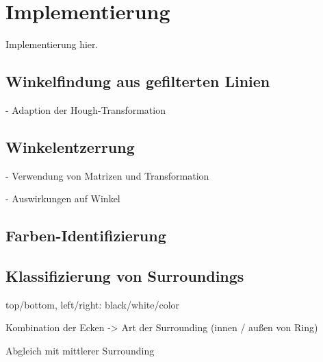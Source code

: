 
\section{Implementierung}
\label{sec:cv:implementierung}

Implementierung hier.


\subsection{Winkelfindung aus gefilterten Linien}
\label{sec:winkelfindung_impl}

- Adaption der Hough-Transformation



\subsection{Winkelentzerrung}
\label{sec:winkelentzerrung_impl}


- Verwendung von Matrizen und Transformation

- Auswirkungen auf Winkel


\subsection{Farben-Identifizierung}
\label{sec:farbidentifizierung_impl}



\subsection{Klassifizierung von Surroundings}
\label{sec:surroundings_impl}

top/bottom, left/right: black/white/color

Kombination der Ecken -> Art der Surrounding (innen / außen von Ring)

Abgleich mit mittlerer Surrounding
